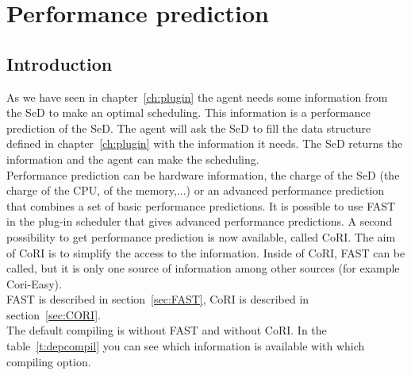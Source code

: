 
\chapter{Performance prediction}
\label{chapter:performance}
\section{Introduction}

As we have seen in chapter~\ref{ch:plugin} the agent needs some
information from the SeD to make an optimal scheduling. This
information is a performance prediction of the SeD. The agent will
ask the SeD to fill the data structure defined in
chapter~\ref{ch:plugin} with the information it needs. The SeD returns
the information and the agent can make the scheduling. \\
Performance prediction can be hardware information, the charge of
the SeD (the charge of the CPU, of the memory,...) or an advanced
performance prediction that combines a set of basic performance
predictions. It is possible to use
FAST in the plug-in scheduler that gives advanced performance predictions. A
second possibility to get performance prediction is now available,
called CoRI. The aim of CoRI is to simplify
the access to the information. Inside of CoRI, FAST can be called,
but it is only one source of information among other sources (for
example Cori-Easy). \\
 FAST is described in section~\ref{sec:FAST}, CoRI is
described in section~\ref{sec:CORI}.\\
The default compiling is without FAST and
without CoRI. In the table~\ref{t:depcompil} you can see which
information is available with which compiling option.

